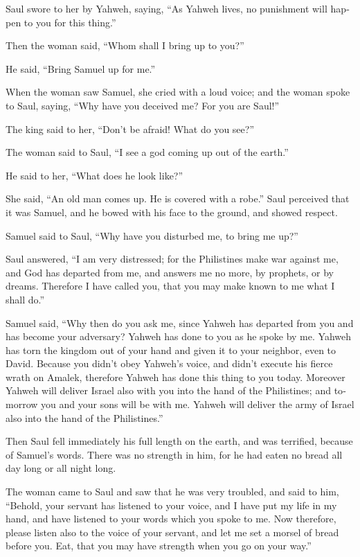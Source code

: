 \begin{paracol}{2}
\begin{otherlanguage}{english}
 Saul swore to her by Yahweh, saying, ``As Yahweh lives,
no punishment will happen to you for this thing.''

 Then the woman said, ``Whom shall I bring up to you?''

He said, ``Bring Samuel up for me.''

 When the woman saw Samuel, she cried with a loud voice;
and the woman spoke to Saul, saying, ``Why have you deceived me? For you
are Saul!''

 The king said to her, ``Don't be afraid! What do you
see?''

The woman said to Saul, ``I see a god coming up out of the earth.''

 He said to her, ``What does he look like?''

She said, ``An old man comes up. He is covered with a robe.'' Saul
perceived that it was Samuel, and he bowed with his face to the ground,
and showed respect.

 Samuel said to Saul, ``Why have you disturbed me, to
bring me up?''

Saul answered, ``I am very distressed; for the Philistines make war
against me, and God has departed from me, and answers me no more, by
prophets, or by dreams. Therefore I have called you, that you may make
known to me what I shall do.''

 Samuel said, ``Why then do you ask me, since Yahweh has
departed from you and has become your adversary?  Yahweh
has done to you as he spoke by me. Yahweh has torn the kingdom out of
your hand and given it to your neighbor, even to David. 
Because you didn't obey Yahweh's voice, and didn't execute his fierce
wrath on Amalek, therefore Yahweh has done this thing to you today.
 Moreover Yahweh will deliver Israel also with you into
the hand of the Philistines; and tomorrow you and your sons will be with
me. Yahweh will deliver the army of Israel also into the hand of the
Philistines.''

 Then Saul fell immediately his full length on the earth,
and was terrified, because of Samuel's words. There was no strength in
him, for he had eaten no bread all day long or all night long.

 The woman came to Saul and saw that he was very
troubled, and said to him, ``Behold, your servant has listened to your
voice, and I have put my life in my hand, and have listened to your
words which you spoke to me.  Now therefore, please
listen also to the voice of your servant, and let me set a morsel of
bread before you. Eat, that you may have strength when you go on your
way.''


\end{otherlanguage}
\end{paracol}
